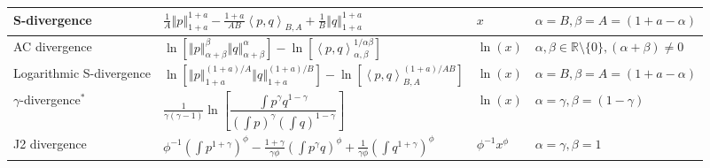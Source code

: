 \documentclass[11pt]{article}
\theoremstyle{plain}
\theoremstyle{remark}
\def\R{\mathbb{R}}
\newcommand{\norm}[1]{\left\Vert #1 \right\Vert}
\newcommand{\inner}[1]{\left\langle #1\right\rangle}
\begin{document}
\begin{table}[!t]
{\begin{tabular}{llll}
            \makecell[l]{S-divergence \\ \citep{ghosh2017generalized}}                                                                       & $\frac{1}{A}\norm{p}_{1+a}^{1+a} - \frac{1+a}{AB}\inner{p,q}_{B,A} + \frac{1}{B} \norm{q}_{1+a}^{1+a}$                                                                          & $x$                                                           & $\alpha = B, \beta = A = (1+a - \alpha)$                      \\
            \midrule
            \makecell[l]{AC divergence \\ \citep{cichocki2010families}}                                                                      & $\ln\left[ \norm{p}_{\alpha+\beta}^{\beta} \norm{q}_{\alpha+\beta}^\alpha \right] - \ln\left[\inner{p, q}_{\alpha,\beta}^{1/\alpha\beta} \right]$                               & $\ln(x)$                                                      & $\alpha, \beta \in \R \setminus \{0\}, (\alpha +\beta)\neq 0$ \\
            \makecell[l]{Logarithmic S-divergence \\ \citep{maji2014logarithmic}}                                                            & $\ln\left[ \norm{p}_{1+a}^{(1+a)/A} \norm{q}_{1+a}^{(1+a)/B} \right] - \ln\left[\inner{p, q}_{B,A}^{(1+a)/AB} \right]$                                                          & $\ln(x)$                                                      & $\alpha = B, \beta = A = (1+a - \alpha)$                      \\
            \makecell[l]{$\gamma$-divergence$^\ast$ \\ \citep{cichocki2010families}}                                                                & $\frac{1}{\gamma(\gamma - 1)}\ln\left[ \dfrac{\int p^\gamma q^{1-\gamma}}{(\int p)^\gamma (\int q)^{1 - \gamma}} \right]$                                                       & $\ln(x)$                                                      & $\alpha = \gamma, \beta = (1-\gamma)$                         \\
            \midrule
            \makecell[l]{J2 divergence \\ \citep{jones2001comparison}}                                                                     & $\phi^{-1}\left( \int p^{1+\gamma} \right)^\phi - \frac{1+\gamma}{\gamma \phi}\left( \int p^\gamma q \right)^\phi + \frac{1}{\gamma \phi}\left( \int q^{1+\gamma} \right)^\phi$ & $\phi^{-1} x^\phi$                                            & $\alpha = \gamma, \beta = 1$                                  \\

\end{tabular}}
\end{table}
\end{document}
